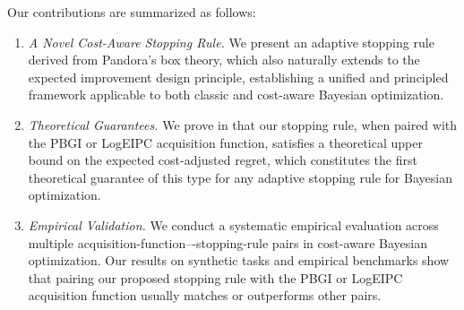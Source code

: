 Our contributions are summarized as follows:
\begin{enumerate}
\item \emph{A Novel Cost-Aware Stopping Rule.} We present an adaptive stopping rule derived from Pandora's box theory, which also naturally extends to the expected improvement design principle, establishing a unified and principled framework applicable to both classic and cost-aware Bayesian optimization.
\item \emph{Theoretical Guarantees.} We prove in  that our stopping rule, when paired with the PBGI or LogEIPC acquisition function, satisfies a theoretical upper bound on the expected cost-adjusted regret, which constitutes the first theoretical guarantee of this type for any adaptive stopping rule for Bayesian optimization.
\item \emph{Empirical Validation.} We conduct a systematic empirical evaluation across multiple acquisition-function–-stopping-rule pairs in cost-aware Bayesian optimization. Our results on synthetic tasks and empirical benchmarks show that pairing our proposed stopping rule with the PBGI or LogEIPC acquisition function usually matches or outperforms other pairs.
\end{enumerate}